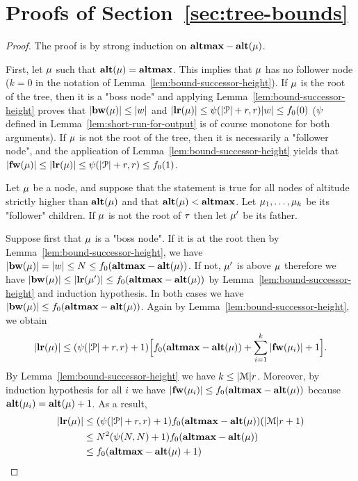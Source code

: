 \section{Proofs of Section~\ref{sec:tree-bounds}}

\lemBoundLengthHeightH*

\begin{proof}
	The proof is by strong induction on $\mathbf{altmax}-\mathbf{alt}(\mu)$.

	First, let $\mu$ such that $\mathbf{alt}(\mu) = \mathbf{altmax}$. This implies that $\mu$ has no follower node ($k=0$ in the notation of Lemma~\ref{lem:bound-successor-height}).  If $\mu$ is the root of the tree, then it is a "boss node" and applying Lemma~\ref{lem:bound-successor-height} proves that $|\mathbf{bw}(\mu)| \leq |w|$ and $|\mathbf{lr}(\mu)| \leq \psi(|\mathcal{P}|+r,r) |w| \leq f_0(0)$ ($\psi$ defined in Lemma~\ref{lem:short-run-for-output} is of course monotone for both arguments). If $\mu$ is not the root of the tree, then it is necessarily a "follower node", and the application of Lemma~\ref{lem:bound-successor-height} yields that $|\mathbf{fw}(\mu)| \leq |\mathbf{lr}(\mu)| \leq \psi(|\mathcal{P}|+r,r) \leq f_0(1)$.   

	Let $\mu$ be a node, and suppose that the statement is true for all nodes of altitude strictly higher than $\mathbf{alt}(\mu)$ and that $\mathbf{alt}(\mu) < \mathbf{altmax}$. 
	Let $\mu_1, \ldots, \mu_k$ be its "follower" children. If $\mu$ is not the root of $\tau$ then let $\mu'$ be its father.
	
	Suppose first that $\mu$ is a "boss node". If it is at the root then by Lemma~\ref{lem:bound-successor-height}, we have $|\mathbf{bw}(\mu)| = |w| \leq N \leq f_0(\mathbf{altmax} - \mathbf{alt}(\mu))$. If not, $\mu'$ is above $\mu$ therefore we have $|\mathbf{bw}(\mu)| \leq |\mathbf{lr}(\mu')| \leq f_0(\mathbf{altmax} - \mathbf{alt}(\mu))$ by Lemma~\ref{lem:bound-successor-height} and induction hypothesis. In both cases we have $|\mathbf{bw}(\mu)| \leq f_0(\mathbf{altmax} - \mathbf{alt}(\mu))$.	
	Again by Lemma~\ref{lem:bound-successor-height}, we obtain \[|\mathbf{lr}(\mu)| \leq (\psi(|\mathcal{P}|+r,r)+1) \Big[f_0(\mathbf{altmax}-\mathbf{alt}(\mu)) + \sum_{i=1}^k |\mathbf{fw}(\mu_i)| +1 \Big]. \]
	By Lemma~\ref{lem:bound-successor-height} we have $k \leq |\mathcal{M}| r$.
	Moreover, by induction hypothesis for all $i$ we have 
	$|\mathbf{fw}(\mu_i)| \leq f_0(\mathbf{altmax}-\mathbf{alt}(\mu))$ because $\mathbf{alt}(\mu_i) = \mathbf{alt}(\mu)+1$. As a result, 
	\begin{align*}
	|\mathbf{lr}(\mu)|& 
	\leq (\psi(|\mathcal{P}|+r,r)+1) f_0(\mathbf{altmax}-\mathbf{alt}(\mu))(|\mathcal{M}| r +1) \\&  
	\leq N^2(\psi(N,N) +1) f_0(\mathbf{altmax} - \mathbf{alt}(\mu)) \\& 
	\leq f_0(\mathbf{altmax} - \mathbf{alt}(\mu)+1)
	\end{align*}
	

\end{proof}
